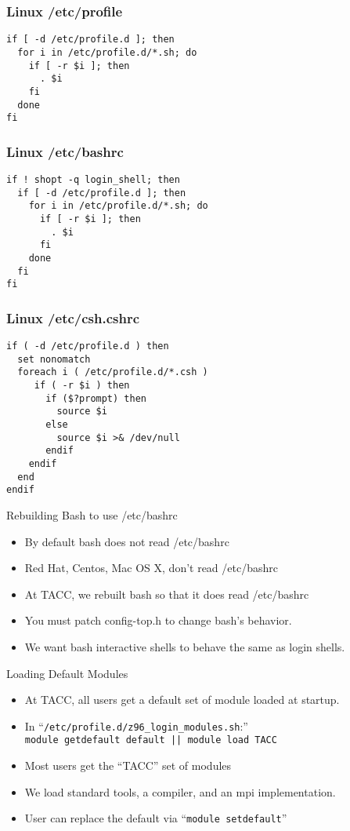\documentclass{beamer}
\begin{document}
\begin{frame}[fragile]
    \frametitle{Linux /etc/profile}
    {
\begin{verbatim}
if [ -d /etc/profile.d ]; then
  for i in /etc/profile.d/*.sh; do
    if [ -r $i ]; then
      . $i
    fi
  done
fi
\end{verbatim}
    }
\end{frame}


\begin{frame}[fragile]
    \frametitle{Linux /etc/bashrc}
    {
\begin{verbatim}
if ! shopt -q login_shell; then
  if [ -d /etc/profile.d ]; then
    for i in /etc/profile.d/*.sh; do
      if [ -r $i ]; then
        . $i
      fi
    done
  fi
fi
\end{verbatim}
    }
\end{frame}

\begin{frame}[fragile]
    \frametitle{Linux /etc/csh.cshrc}
    {
\begin{verbatim}
if ( -d /etc/profile.d ) then
  set nonomatch
  foreach i ( /etc/profile.d/*.csh )
     if ( -r $i ) then
       if ($?prompt) then
         source $i
       else
         source $i >& /dev/null
       endif
    endif
  end
endif
\end{verbatim}
    }
\end{frame}

\begin{frame}{Rebuilding Bash to use /etc/bashrc}
  \begin{itemize}
    \item By default bash does not read /etc/bashrc
    \item Red Hat, Centos,  Mac OS X, don't read /etc/bashrc
    \item At TACC, we rebuilt bash so that it does read /etc/bashrc
    \item You must patch config-top.h to change bash's behavior.
    \item We want bash interactive shells to behave the same as login shells.
  \end{itemize}
\end{frame}

\begin{frame}{Loading Default Modules}
  \begin{itemize}
    \item At TACC, all users get a default set of module loaded at startup.
    \item In ``\texttt{/etc/profile.d/z96\_login\_modules.sh}:'' \\
      {\color{blue}\texttt{module getdefault default || module load TACC}}
    \item Most users get the ``TACC'' set of modules
    \item We load standard tools, a compiler, and an mpi implementation.
    \item User can replace the default via ``{\color{blue}\texttt{module setdefault}}''
  \end{itemize}
\end{frame}
\end{document}

